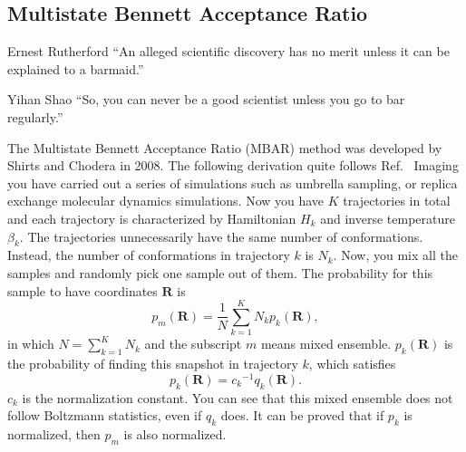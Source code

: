 \subsection{Multistate Bennett Acceptance Ratio\label{Sec:FEM:MBAR}}
\begin{chapquote}{Ernest Rutherford%
	}
	``An alleged scientific discovery has no merit unless it can be explained to a barmaid.''
\end{chapquote}
\begin{chapquote}{Yihan Shao}
	``So, you can never be a good scientist unless you go to bar regularly.''
\end{chapquote}
The Multistate Bennett Acceptance Ratio (MBAR) method was developed by Shirts and Chodera in 2008.\cite{ShirtsJCP2008} The following derivation quite follows Ref.~\cite{ShirtsarXiv2017}
Imaging you have carried out a series of simulations such as umbrella sampling, or replica exchange molecular dynamics simulations.
Now you have $K$ trajectories in total and each trajectory is characterized by Hamiltonian $H_k$ and inverse temperature $\beta_k$. The trajectories unnecessarily have the same number of conformations. Instead, the number of conformations in trajectory $k$ is $N_k$. Now, you mix all the samples and randomly pick one sample out of them. The probability for this sample to have coordinates $\mathbf{R}$ is 
\begin{equation}
p_m(\mathbf{R})=\frac 1N\sum_{k=1}^{K}N_kp_k(\mathbf{R}),
\end{equation}
in which $N=\sum\limits_{k=1}^{K}N_k$ and the subscript $m$ means mixed ensemble. $p_k(\mathbf{R})$ is the probability of finding this snapshot in trajectory $k$, which satisfies
\begin{equation}
p_k(\mathbf{R})={c_k}^{-1}q_k(\mathbf{R}).
\end{equation}
$c_k$ is the normalization constant. You can see that this mixed ensemble does not follow Boltzmann statistics, even if $q_k$ does. It can be proved that if $p_k$ is normalized, then $p_m$ is also normalized.

